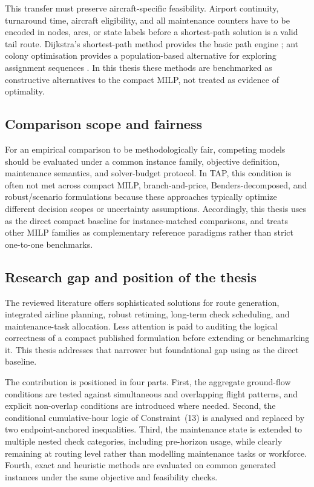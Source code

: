 This transfer must preserve aircraft-specific feasibility. Airport continuity,
turnaround time, aircraft eligibility, and all maintenance counters have to be
encoded in nodes, arcs, or state labels before a shortest-path solution is a
valid tail route. Dijkstra's shortest-path method provides the basic path engine
\citep{dijkstra1959note}; ant colony optimisation provides a population-based
alternative for exploring assignment sequences \citep{dorigo1996ant,
dorigo2004ant}. In this thesis these methods are benchmarked as constructive
alternatives to the compact MILP, not treated as evidence of optimality.



\subsection{Comparison scope and fairness}

For an empirical comparison to be methodologically fair, competing models
should be evaluated under a common instance family, objective definition,
maintenance semantics, and solver-budget protocol.  In TAP, this condition is
often not met across compact MILP, branch-and-price, Benders-decomposed, and
robust/scenario formulations because these approaches typically optimize
different decision scopes or uncertainty assumptions.  Accordingly, this thesis
uses \citet{khaled2018compact} as the direct compact baseline for
instance-matched comparisons, and treats other MILP families as complementary
reference paradigms rather than strict one-to-one benchmarks.



\subsection{Research gap and position of the thesis}

The reviewed literature offers sophisticated solutions for route generation,
integrated airline planning, robust retiming, long-term check scheduling, and
maintenance-task allocation. Less attention is paid to auditing the logical
correctness of a compact published formulation before extending or benchmarking
it. This thesis addresses that narrower but foundational gap using
\citet{khaled2018compact} as the direct baseline.

The contribution is positioned in four parts. First, the aggregate ground-flow
conditions are tested against simultaneous and overlapping flight patterns, and
explicit non-overlap conditions are introduced where needed. Second, the
conditional cumulative-hour logic of Constraint~(13) is analysed and replaced
by two endpoint-anchored inequalities. Third, the maintenance state is extended
to multiple nested check categories, including pre-horizon usage, while clearly
remaining at routing level rather than modelling maintenance tasks or workforce.
Fourth, exact and heuristic methods are evaluated on common generated instances
under the same objective and feasibility checks.

